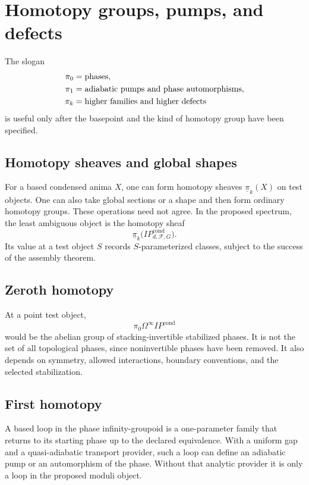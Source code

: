 \documentclass[12pt]{article}
\theoremstyle{definition}
\theoremstyle{remark}
\newcommand{\F}{\mathcal F}
\newcommand{\IP}{\mathit{IP}}
\begin{document}
\section{Homotopy groups, pumps, and defects}

The slogan
\begin{align}
\pi_0&=\text{phases},\notag\\
\pi_1&=\text{adiabatic pumps and phase automorphisms},\notag\\
\pi_k&=\text{higher families and higher defects}
\label{eq:homotopy-slogan}
\end{align}
is useful only after the basepoint and the kind of homotopy group have been
specified.

\subsection{Homotopy sheaves and global shapes}

For a based condensed anima $X$, one can form homotopy sheaves
$\underline\pi_k(X)$ on test objects.  One can also take global sections or
a shape and then form ordinary homotopy groups.  These operations need not
agree.  In the proposed spectrum, the least ambiguous object is the homotopy
sheaf
\begin{equation}
\underline\pi_k\bigl(\IP^{\mathrm{cond}}_{d,\F,G}\bigr).
\end{equation}
Its value at a test object $S$ records $S$-parameterized classes, subject to
the success of the assembly theorem.

\subsection{Zeroth homotopy}

At a point test object,
\begin{equation}
\pi_0\Omega^\infty\IP^{\mathrm{cond}}
\end{equation}
would be the abelian group of stacking-invertible stabilized phases.  It is
not the set of all topological phases, since noninvertible phases have been
removed.  It also depends on symmetry, allowed interactions, boundary
conventions, and the selected stabilization.

\subsection{First homotopy}

A based loop in the phase infinity-groupoid is a one-parameter family that
returns to its starting phase up to the declared equivalence.  With a
uniform gap and a quasi-adiabatic transport provider, such a loop can define
an adiabatic pump or an automorphism of the phase.  Without that analytic
provider it is only a loop in the proposed moduli object.
\end{document}

